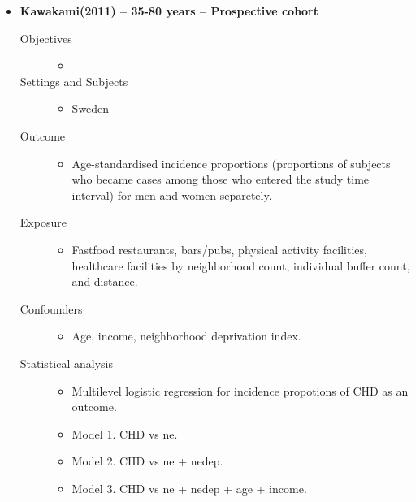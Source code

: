 \documentclass{article}
\begin{document}
\begin{itemize}
\item{\bf Kawakami(2011) -- 35-80 years  -- Prospective cohort} 
		\begin{description}
			\item[Objectives] \mbox{}\par
				\begin{itemize}
					\item 
				\end{itemize}
			\item[Settings and Subjects] \mbox{}\par
				\begin{itemize}
					\item Sweden
				\end{itemize}
			\item[Outcome]\mbox{}\par
				\begin{itemize}
					\item Age-standardised incidence proportions (proportions of subjects who became cases among those who entered the study time interval) for men and women separetely. 
				\end{itemize}
			\item[Exposure] \mbox{}\par
				\begin{itemize}
					\item Fastfood restaurants, bars/pubs, physical activity facilities, healthcare facilities by neighborhood count, individual buffer count, and distance. 
				\end{itemize}
			\item[Confounders] \mbox{}\par
				\begin{itemize}
					\item Age, income, neighborhood deprivation index. 
				\end{itemize}
			\item[Statistical analysis] \mbox{}\par
				\begin{itemize}
					\item Multilevel logistic regression for incidence propotions of CHD as an outcome. 
					\item Model 1. CHD vs ne. 
					\item Model 2. CHD vs ne + nedep. 
					\item Model 3. CHD vs ne + nedep + age + income.  
				\end{itemize}

\end{description}
\end{itemize}
\end{document}
